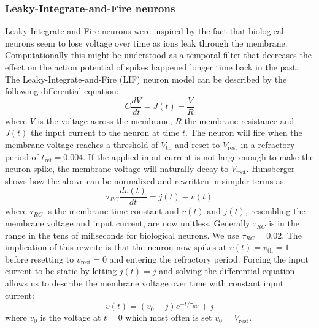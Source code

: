 \documentclass[a4paper,11pt]{article} %
\begin{document}
\subsubsection{Leaky-Integrate-and-Fire neurons}
Leaky-Integrate-and-Fire neurons were inspired by the fact that biological neurons seem to lose voltage over time as ions leak through the membrane. Computationally this might be understood as a temporal filter that decreases the effect on the action potential of spikes happened longer time back in the past. The Leaky-Integrate-and-Fire (LIF) neuron model can be described by the following differential equation:
\begin{equation}
  C \frac{d V}{dt}=J(t)-\frac{V}{R}
\end{equation}
where $V$ is the voltage across the membrane, $R$ the membrane resistance and $J(t)$ the input current to the neuron at time $t$. The neuron will fire when the membrane voltage reaches a threshold of $V_\text{th}$ and reset to $V_\text{rest}$ in a refractory period of $t_\text{ref} = 0.004$. If the applied input current is not large enough to make the neuron spike, the membrane voltage will naturally decay to $V_\text{rest}$. Hunsberger \cite{Eric2018} shows how the above can be normalized and rewritten in simpler terms as:
\begin{equation}
  \tau_{RC} \frac{dv(t)}{dt} = j(t) - v(t) 
\end{equation}
where $\tau_{RC}$ is the membrane time constant and $v(t)$ and $j(t)$, resembling the membrane voltage and input current, are now unitless. Generally $\tau_{RC}$ is in the range in the tens of miliseconds for biological neurons. We use $\tau_{RC}=0.02$. The implication of this rewrite is that the neuron now spikes at $v(t) = v_\text{th} = 1$ before resetting to $v_\text{rest} = 0$ and entering the refractory period. Forcing the input current to be static by letting $j(t) = j$ and solving the differential equation allows us to describe the membrane voltage over time with constant input current:
\begin{equation}
  v(t) = (v_0 - j) e^{-t/\tau_{RC}} + j
\end{equation}
where $v_0$ is the voltage at $t=0$ which most often is set $v_0 = V_\text{rest}$. %
\end{document}
